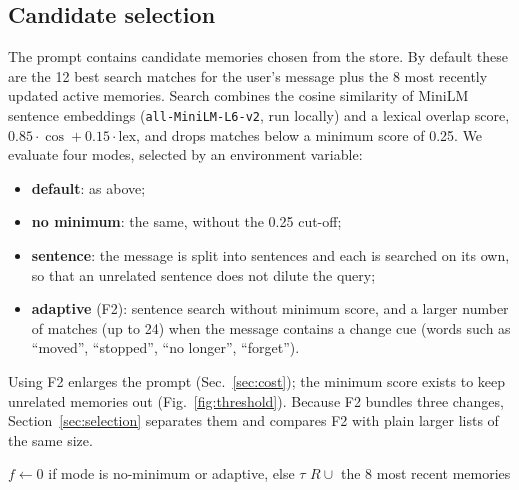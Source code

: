 \IfFileExists{IEEEtran.cls}{\documentclass[journal]{IEEEtran}\def\HAVEIEEE{1}}{\documentclass[10pt,twocolumn]{article}\usepackage[margin=0.7in,columnsep=0.25in]{geometry}}
\begin{document}
\subsection{Candidate selection}
\label{sec:candidates}
The prompt contains candidate memories chosen from the store. By default these are the 12 best search matches for the user's message plus the 8 most recently updated active memories. Search combines the cosine similarity of MiniLM sentence embeddings \cite{wang2020minilm} (\texttt{all-MiniLM-L6-v2}, run locally) and a lexical overlap score, $0.85\cdot\cos + 0.15\cdot\mathrm{lex}$, and drops matches below a minimum score of 0.25. We evaluate four modes, selected by an environment variable:
\begin{itemize}
\item \textbf{default}: as above;
\item \textbf{no minimum}: the same, without the 0.25 cut-off;
\item \textbf{sentence}: the message is split into sentences and each is searched on its own, so that an unrelated sentence does not dilute the query;
\item \textbf{adaptive} (F2): sentence search without minimum score, and a larger number of matches (up to 24) when the message contains a change cue (words such as ``moved'', ``stopped'', ``no longer'', ``forget'').
\end{itemize}
Using F2 enlarges the prompt (Sec.~\ref{sec:cost}); the minimum score exists to keep unrelated memories out (Fig.~\ref{fig:threshold}). Because F2 bundles three changes, Section~\ref{sec:selection} separates them and compares F2 with plain larger lists of the same size.

\begin{algorithm}[t]
\caption{Candidate selection (modes \emph{default} and \emph{adaptive})}
\label{alg:cand}
\small
{}
$f \leftarrow 0$ if mode is no-minimum or adaptive, else $\tau$\;
\Return $R \cup$ the 8 most recent memories\;
\end{algorithm}
\end{document}
